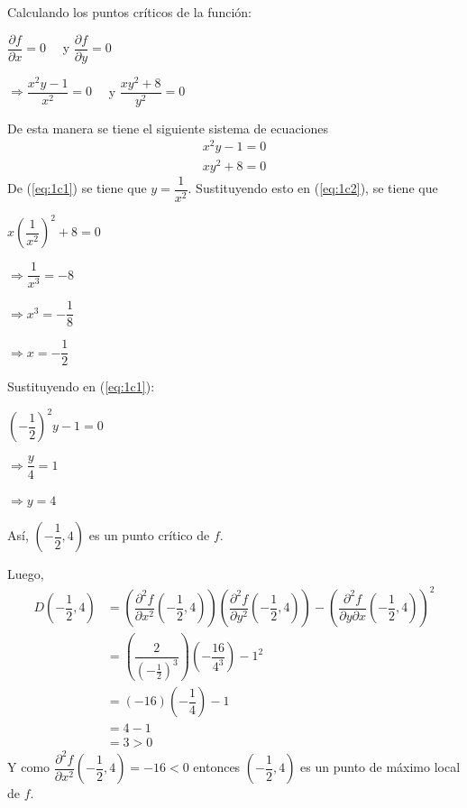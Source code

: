 \documentclass[fleqn, 12pt]{article}
\newcommand{\derivadaparcial}[2]{\dfrac{\partial {#1}}{\partial {#2}}}
\newcommand{\derivadaparcialn}[3]{\dfrac{\partial^{#3} {#1}}{\partial {#2}^{#3}}}
\newcommand{\derivadaparcialnd}[3]{\dfrac{\partial^{2} {#1}}{\partial {#3} \partial {#2}}}
\begin{document}
\begin{enumerate}
\begin{enumerate}
            Calculando los puntos críticos de la función:

            $ \derivadaparcial{f}{x} = 0 \quad $ y $ \derivadaparcial{f}{y} = 0 $

            $ \Longrightarrow \dfrac{x^2 y - 1}{x^2} = 0 \quad $ y $\dfrac{x y^2 + 8}{y^2} = 0 $

            De esta manera se tiene el siguiente sistema de ecuaciones
            \begin{align}
                x^2 y - 1 = 0 \label{eq:1c1} \\
                xy^2 + 8 = 0 \label{eq:1c2}
            \end{align}
            De (\ref{eq:1c1}) se tiene que $ y = \dfrac{1}{x^2} $. Sustituyendo esto en (\ref{eq:1c2}), se tiene que

            $ x \left( \dfrac{1}{x^2} \right)^2 + 8 = 0 $

            $ \Longrightarrow \dfrac{1}{x^3} = -8 $

            $ \Longrightarrow x^3 = -\dfrac{1}{8} $

            $ \Longrightarrow x = -\dfrac{1}{2} $

            Sustituyendo en (\ref{eq:1c1}): 

            $ \left( -\dfrac{1}{2} \right)^2 y - 1 = 0 $

            $ \Longrightarrow \dfrac{y}{4} = 1 $

            $ \Longrightarrow y = 4 $

            Así, $ \left( -\dfrac{1}{2}, 4 \right) $ es un punto crítico de $ f $.

            Luego, 
            \begin{align}
                D \left( -\dfrac{1}{2}, 4 \right) &= \left( \derivadaparcialn{f}{x}{2} \left( -\dfrac{1}{2}, 4 \right) \right) \left( \derivadaparcialn{f}{y}{2} \left( -\dfrac{1}{2}, 4 \right) \right) - \left( \derivadaparcialnd{f}{x}{y} \left( -\dfrac{1}{2}, 4 \right) \right)^2 \\
                &= \left( \dfrac{2}{\left( -\frac{1}{2} \right)^3} \right) \left( - \dfrac{16}{4^3} \right) - 1^2 \\
                &= (-16) \left( - \dfrac{1}{4} \right) - 1 \\
                &= 4 - 1 \\
                &= 3 > 0
            \end{align}
            Y como $ \derivadaparcialn{f}{x}{2} \left( -\dfrac{1}{2}, 4 \right) = -16 < 0 $ entonces $ \left( -\dfrac{1}{2}, 4 \right) $ es un punto de máximo local de $ f $.


\end{enumerate}
\end{enumerate}
\end{document}
